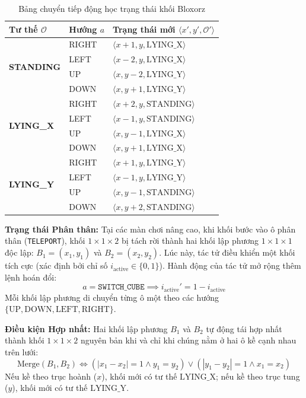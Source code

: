 \begin{table}[H]
\centering
\caption{Bảng chuyển tiếp động học trạng thái khối Bloxorz}
\label{tab:kinematics_rules}
\small
\begin{tabular}{lll}
\toprule
\textbf{Tư thế $\mathcal{O}$}
& \textbf{Hướng $a$}
& \textbf{Trạng thái mới $\langle x', y', \mathcal{O}' \rangle$} \\
\midrule
\multirow{4}{*}{\textbf{STANDING}}
& RIGHT & $\langle x+1, y, \text{LYING\_X} \rangle$ \\
& LEFT  & $\langle x-2, y, \text{LYING\_X} \rangle$ \\
& UP    & $\langle x, y-2, \text{LYING\_Y} \rangle$ \\
& DOWN  & $\langle x, y+1, \text{LYING\_Y} \rangle$ \\
\midrule
\multirow{4}{*}{\textbf{LYING\_X}}
& RIGHT & $\langle x+2, y, \text{STANDING} \rangle$ \\
& LEFT  & $\langle x-1, y, \text{STANDING} \rangle$ \\
& UP    & $\langle x, y-1, \text{LYING\_X} \rangle$ \\
& DOWN  & $\langle x, y+1, \text{LYING\_X} \rangle$ \\
\midrule
\multirow{4}{*}{\textbf{LYING\_Y}}
& RIGHT & $\langle x+1, y, \text{LYING\_Y} \rangle$ \\
& LEFT  & $\langle x-1, y, \text{LYING\_Y} \rangle$ \\
& UP    & $\langle x, y-1, \text{STANDING} \rangle$ \\
& DOWN  & $\langle x, y+2, \text{STANDING} \rangle$ \\
\bottomrule
\end{tabular}
\end{table}

\noindent
\textbf{Trạng thái Phân thân:}
Tại các màn chơi nâng cao, khi khối bước vào ô phân thân (\texttt{TELEPORT}),
khối $1 \times 1 \times 2$ bị tách rời thành hai khối lập phương
$1 \times 1 \times 1$ độc lập: $B_1 = (x_1, y_1)$ và $B_2 = (x_2, y_2)$.
Lúc này, tác tử điều khiển một khối tích cực (xác định bởi chỉ số
$i_{\text{active}} \in \{0, 1\}$). Hành động của tác tử mở rộng thêm
lệnh hoán đổi:
\begin{equation}
    a = \texttt{SWITCH\_CUBE}
    \implies i_{\text{active}}' = 1 - i_{\text{active}}
\end{equation}
Mỗi khối lập phương di chuyển từng ô một theo các hướng
$\{ \text{UP}, \text{DOWN}, \text{LEFT}, \text{RIGHT} \}$.

\noindent
\textbf{Điều kiện Hợp nhất:}
Hai khối lập phương $B_1$ và $B_2$ tự động tái hợp nhất thành khối
$1 \times 1 \times 2$ nguyên bản khi và chỉ khi chúng nằm ở hai ô kề
cạnh nhau trên lưới:
\begin{equation}
    \text{Merge}(B_1, B_2) \iff
    (|x_1 - x_2| = 1 \land y_1 = y_2)
    \lor (|y_1 - y_2| = 1 \land x_1 = x_2)
\end{equation}
Nếu kề theo trục hoành ($x$), khối mới có tư thế $\text{LYING\_X}$; nếu kề
theo trục tung ($y$), khối mới có tư thế $\text{LYING\_Y}$.

